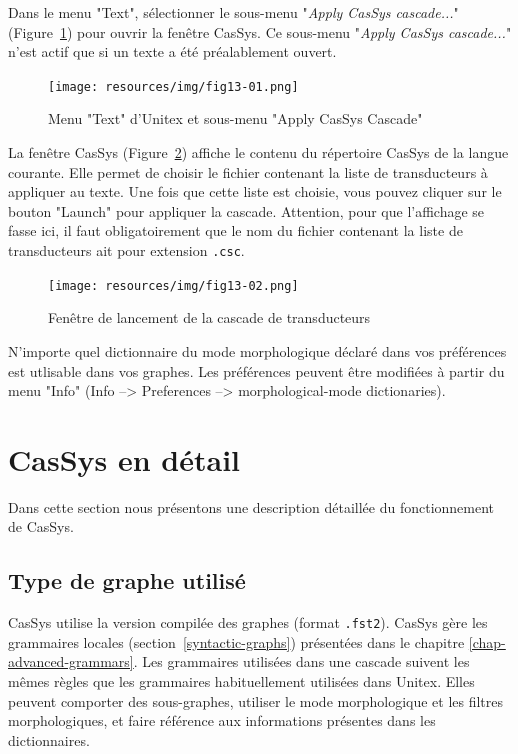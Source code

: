 Dans le menu "Text", sélectionner le sous-menu "\textit{Apply CasSys cascade...}" (Figure~\ref{fig13-01}) pour ouvrir la fenêtre CasSys.
Ce sous-menu "\textit{Apply CasSys cascade...}" n'est actif que si un texte a été préalablement ouvert.

\begin{figure}[!htb]
 \centering
 \texttt{[image: resources/img/fig13-01.png]}
 \caption{Menu "Text" d'Unitex et sous-menu "Apply CasSys Cascade"}
 \label{fig13-01}
\end{figure}

La fenêtre CasSys (Figure~\ref{fig13-02}) affiche le contenu du répertoire CasSys de la langue courante. Elle
permet de choisir le fichier contenant la liste de transducteurs à appliquer au texte. Une fois que cette liste
est choisie, vous pouvez cliquer sur le bouton "Launch" pour appliquer la cascade. Attention, pour que l'affichage se fasse ici, il faut obligatoirement que le nom du fichier contenant la liste de transducteurs ait pour extension \verb+.csc+.

\begin{figure}[!htb]
  \centering
  \texttt{[image: resources/img/fig13-02.png]}
  \caption{Fenêtre de lancement de la cascade de transducteurs}
  \label{fig13-02}
\end{figure}

N'importe quel dictionnaire du mode morphologique déclaré dans vos préférences est utlisable dans vos
graphes.
Les  préférences peuvent être modifiées à partir du menu "Info" (Info -->
Preferences --> morphological-mode dictionaries).

\section{CasSys en détail}

Dans cette section nous présentons une description détaillée du fonctionnement de CasSys.

\subsection{Type de graphe utilisé}
\label{graphs-for-cassys}

CasSys utilise la version compilée des graphes (format \verb+.fst2+). CasSys gère les grammaires locales
(section~\ref{syntactic-graphs}) présentées dans le chapitre \ref{chap-advanced-grammars}.
Les grammaires utilisées dans une cascade suivent les mêmes règles que les grammaires habituellement
utilisées dans Unitex. Elles peuvent comporter des sous-graphes, utiliser le mode morphologique et les filtres
morphologiques, et faire référence aux informations présentes dans les dictionnaires. 


